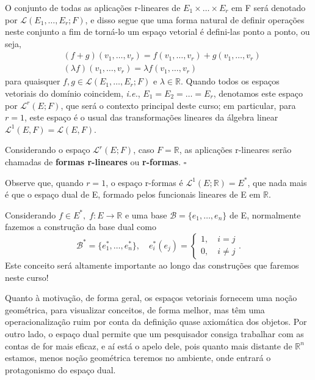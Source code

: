 \documentclass[../differential_forms.tex]{subfiles}
\begin{document}
O conjunto de todas as aplicações r-lineares de \(E_1 \times \dotsc \times E_r\) em F será denotado por \(\mathcal{L}(E_1, \dotsc , E_r; F)\), e disso segue que uma forma natural de definir operações neste conjunto a fim de torná-lo um espaço vetorial é defini-las ponto a ponto, ou seja,
\begin{align*}
	 & (f+g)(v_1, \dotsc , v_r) = f(v_1, \dotsc , v_r) + g(v_1, \dotsc , v_r) \\
	 & (\lambda f)(v_1, \dotsc , v_r) = \lambda f(v_1,\dotsc ,v_r)
\end{align*}
para quaisquer \(f, g\in \mathcal{L}(E_1, \dotsc , E_r; F)\) e \(\lambda \in \mathbb{R}.\) Quando todos os espaços vetoriais do domínio coincidem, \textit{i.e.}, \(E_1= E_2=\dotsc=E_r\), denotamos este espaço por \(\mathcal{L}^{r}(E; F)\), que será o contexto principal deste curso; em particular, para \(r=1\), este espaço é o usual das transformações lineares da álgebra linear \(\mathcal{L}^{1}(E, F) = \mathcal{L}(E, F)\).
\begin{def*}
	Considerando o espaço \(\mathcal{L}^{r}(E; F)\), caso \(F = \mathbb{R}\), as aplicações r-lineares serão chamadas de \textbf{formas r-lineares} ou \textbf{r-formas}. \(\square\)
\end{def*}
Observe que, quando \(r=1\), o espaço r-formas é \(\mathcal{L}^{1}(E; \mathbb{R}) = E^{*}\), que nada mais é que o espaço dual de E, formado pelos funcionais lineares de E em \(\mathbb{R}\).
\begin{tcolorbox}[
		skin=enhanced,
		title=Observação,
		fonttitle=\bfseries,
		colframe=black,
		colbacktitle=cyan!75!white,
		colback=cyan!15,
		colbacklower=black,
		coltitle=black,
		drop fuzzy shadow,
	]
	Considerando \(f\in E^{*},\; f:E\rightarrow \mathbb{R}\) e uma base \(\mathcal{B} = \{e_1, \dotsc, e_n\}\) de E, normalmente fazemos a construção da base dual como
	\[
		\mathcal{B}^{*} = \{e_1^{*}, \dotsc , e_{n}^{*}\},\quad e_{i}^{*}(e_{j}) = \left\{\begin{array}{ll}
			1,\quad i=j \\
			0, \quad i\neq j
		\end{array}\right..
	\]
	Este conceito será altamente importante ao longo das construções que faremos neste curso!

	Quanto à motivação, de forma geral, os espaços vetoriais fornecem uma noção geométrica, para visualizar conceitos, de forma melhor, mas têm uma operacionalização ruim por conta da definição quase axiomática dos objetos. Por outro lado, o espaço dual permite que um pesquisador consiga trabalhar com as contas de for mais eficaz, e aí está o apelo dele, pois quanto mais distante de \(\mathbb{R}^{n}\) estamos, menos noção geométrica teremos no ambiente, onde entrará o protagonismo do espaço dual.
\end{tcolorbox}
\end{document}
